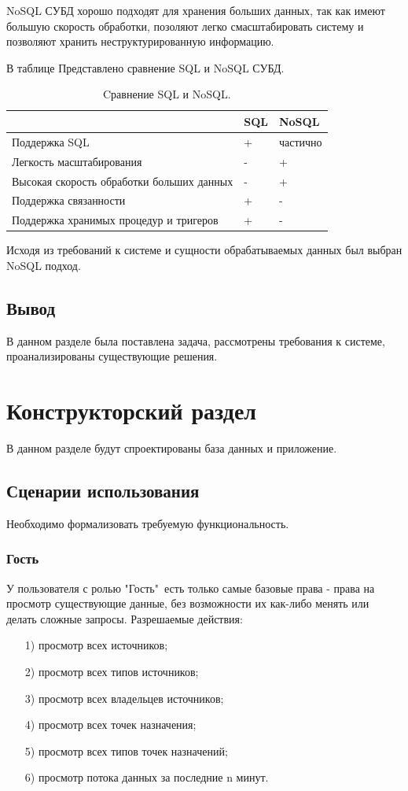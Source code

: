\indent \indent NoSQL СУБД хорошо подходят для хранения больших данных, так как имеют большую скорость обработки, позоляют легко смасштабировать систему и позволяют хранить неструктурированную информацию.


В таблице \label{CompareSQL} Представлено сравнение SQL и NoSQL СУБД. 
\begin{table}[H]
\caption{Cравнение SQL и NoSQL.}
\begin{center}
\begin{tabular}{ |p{5cm} |p{5cm}| p{5cm} |}
\hline
 & SQL & NoSQL  \\ \hline 
Поддержка SQL & + & частично \\ \hline 
Легкость масштабирования & - & +  \\ \hline 
Высокая скорость обработки больших данных & - & + \\ \hline 
Поддержка связанности & + & - \\ \hline 
Поддержка хранимых процедур и тригеров & + & - \\ \hline 
\end{tabular}
\end{center}
\label{CompareSQL}
\end{table}

\indent Исходя из требований к системе и сущности обрабатываемых данных был выбран NoSQL подход.

\subsection{Вывод}
В данном разделе была поставлена задача, рассмотрены требования к системе, проанализированы существующие решения.


\clearpage
\section{Конструкторский раздел}
В данном разделе будут спроектированы база данных и приложение.


\subsection{Сценарии использования}
Необходимо формализовать требуемую функциональность. 
\subsubsection{Гость}
У пользователя с ролью "Гость"\ есть только самые базовые права - права на просмотр существующие данные, без возможности их как-либо менять или делать сложные запросы.
Разрешаемые действия:
\begin{itemize}
	\item[1)] просмотр всех источников;
	\item[2)] просмотр всех типов источников;
	\item[3)] просмотр всех владельцев источников;
	\item[4)] просмотр всех точек назначения;
	\item[5)] просмотр всех типов точек назначений;
	\item[6)] просмотр потока данных за последние n минут.
\end{itemize}

